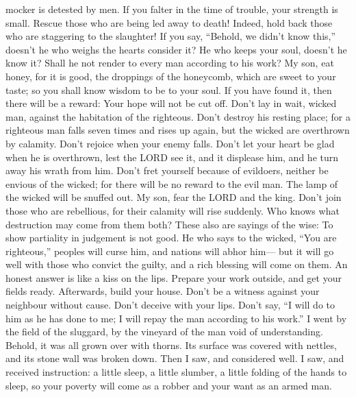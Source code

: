 mocker is detested by men.  If you falter in the time of
trouble, your strength is small.  Rescue those who are
being led away to death! Indeed, hold back those who are staggering to
the slaughter!  If you say, ``Behold, we didn't know
this,'' doesn't he who weighs the hearts consider it? He who keeps your
soul, doesn't he know it? Shall he not render to every man according to
his work?  My son, eat honey, for it is good, the droppings
of the honeycomb, which are sweet to your taste;  so you
shall know wisdom to be to your soul. If you have found it, then there
will be a reward: Your hope will not be cut off.  Don't lay
in wait, wicked man, against the habitation of the righteous. Don't
destroy his resting place;  for a righteous man falls seven
times and rises up again, but the wicked are overthrown by calamity.
 Don't rejoice when your enemy falls. Don't let your heart
be glad when he is overthrown,  lest the LORD see it, and
it displease him, and he turn away his wrath from him. 
Don't fret yourself because of evildoers, neither be envious of the
wicked;  for there will be no reward to the evil man. The
lamp of the wicked will be snuffed out.  My son, fear the
LORD and the king. Don't join those who are rebellious, 
for their calamity will rise suddenly. Who knows what destruction may
come from them both?  These also are sayings of the wise:
To show partiality in judgement is not good.  He who says
to the wicked, ``You are righteous,'' peoples will curse him, and
nations will abhor him---  but it will go well with those
who convict the guilty, and a rich blessing will come on them.
 An honest answer is like a kiss on the lips. 
Prepare your work outside, and get your fields ready. Afterwards, build
your house.  Don't be a witness against your neighbour
without cause. Don't deceive with your lips.  Don't say,
``I will do to him as he has done to me; I will repay the man according
to his work.''  I went by the field of the sluggard, by the
vineyard of the man void of understanding.  Behold, it was
all grown over with thorns. Its surface was covered with nettles, and
its stone wall was broken down.  Then I saw, and considered
well. I saw, and received instruction:  a little sleep, a
little slumber, a little folding of the hands to sleep,  so
your poverty will come as a robber and your want as an armed man.

